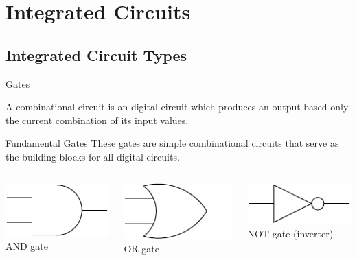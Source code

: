 \section{Integrated Circuits}

\subsection{Integrated Circuit Types}

\begin{frame}{Gates}
  \begin{definition}
    A \alert{combinational circuit} is an digital circuit which produces an output based only the current combination of its input values.
  \end{definition}
  \begin{block}{Fundamental Gates}
    These gates are simple combinational circuits that serve as the building blocks for all digital circuits.
  \end{block}
  \begin{columns}
    \begin{column}{3cm}
      \begin{center}
        \includegraphics{ANDGate}
        \\AND gate
      \end{center}
    \end{column}
    \begin{column}{3cm}
      \begin{center}
        \includegraphics{ORGate}
        \\OR gate
      \end{center}
    \end{column}
    \begin{column}{3cm}
      \begin{center}
        \includegraphics{NOTGate}
        \\NOT gate (inverter)
      \end{center}
    \end{column}
  \end{columns}
\end{frame}


